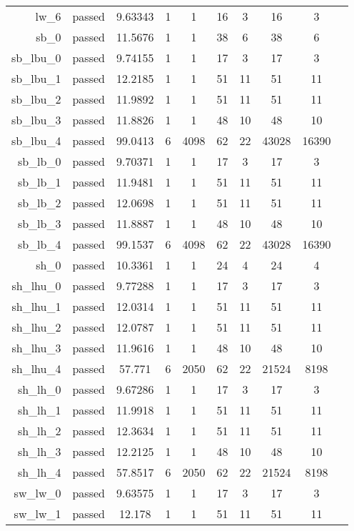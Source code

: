 \begin{longtable}{r|ccccccccc}
    lw\_6 & passed & 9.63343 & 1 & 1 & 16 & 3 & 16 & 3 \\
    sb\_0 & passed & 11.5676 & 1 & 1 & 38 & 6 & 38 & 6 \\
    sb\_lbu\_0 & passed & 9.74155 & 1 & 1 & 17 & 3 & 17 & 3 \\
    sb\_lbu\_1 & passed & 12.2185 & 1 & 1 & 51 & 11 & 51 & 11 \\
    sb\_lbu\_2 & passed & 11.9892 & 1 & 1 & 51 & 11 & 51 & 11 \\
    sb\_lbu\_3 & passed & 11.8826 & 1 & 1 & 48 & 10 & 48 & 10 \\
    sb\_lbu\_4 & passed & 99.0413 & 6 & 4098 & 62 & 22 & 43028 & 16390 \\
    sb\_lb\_0 & passed & 9.70371 & 1 & 1 & 17 & 3 & 17 & 3 \\
    sb\_lb\_1 & passed & 11.9481 & 1 & 1 & 51 & 11 & 51 & 11 \\
    sb\_lb\_2 & passed & 12.0698 & 1 & 1 & 51 & 11 & 51 & 11 \\
    sb\_lb\_3 & passed & 11.8887 & 1 & 1 & 48 & 10 & 48 & 10 \\
    sb\_lb\_4 & passed & 99.1537 & 6 & 4098 & 62 & 22 & 43028 & 16390 \\
    sh\_0 & passed & 10.3361 & 1 & 1 & 24 & 4 & 24 & 4 \\
    sh\_lhu\_0 & passed & 9.77288 & 1 & 1 & 17 & 3 & 17 & 3 \\
    sh\_lhu\_1 & passed & 12.0314 & 1 & 1 & 51 & 11 & 51 & 11 \\
    sh\_lhu\_2 & passed & 12.0787 & 1 & 1 & 51 & 11 & 51 & 11 \\
    sh\_lhu\_3 & passed & 11.9616 & 1 & 1 & 48 & 10 & 48 & 10 \\
    sh\_lhu\_4 & passed & 57.771 & 6 & 2050 & 62 & 22 & 21524 & 8198 \\
    sh\_lh\_0 & passed & 9.67286 & 1 & 1 & 17 & 3 & 17 & 3 \\
    sh\_lh\_1 & passed & 11.9918 & 1 & 1 & 51 & 11 & 51 & 11 \\
    sh\_lh\_2 & passed & 12.3634 & 1 & 1 & 51 & 11 & 51 & 11 \\
    sh\_lh\_3 & passed & 12.2125 & 1 & 1 & 48 & 10 & 48 & 10 \\
    sh\_lh\_4 & passed & 57.8517 & 6 & 2050 & 62 & 22 & 21524 & 8198 \\
    sw\_lw\_0 & passed & 9.63575 & 1 & 1 & 17 & 3 & 17 & 3 \\
    sw\_lw\_1 & passed & 12.178 & 1 & 1 & 51 & 11 & 51 & 11 \\

\end{longtable}
